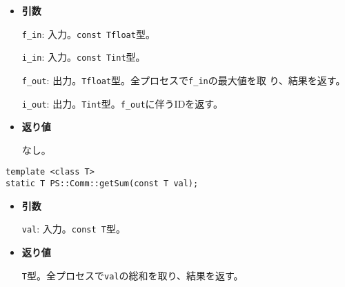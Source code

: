 \begin{itemize}

\item{{\bf 引数}}

{\tt f\_in}: 入力。{\tt const Tfloat}型。

{\tt i\_in}: 入力。{\tt const Tint}型。

{\tt f\_out}: 出力。{\tt Tfloat}型。全プロセスで{\tt f\_in}の最大値を取
り、結果を返す。

{\tt i\_out}: 出力。{\tt Tint}型。{\tt f\_out}に伴うIDを返す。

\item{{\bf 返り値}}

なし。

\end{itemize}


\begin{screen}
\begin{verbatim}
template <class T>
static T PS::Comm::getSum(const T val);
\end{verbatim}
\end{screen}

\begin{itemize}

\item{{\bf 引数}}

{\tt val}: 入力。{\tt const T}型。

\item{{\bf 返り値}}

{\tt T}型。全プロセスで{\tt val}の総和を取り、結果を返す。

\end{itemize}
